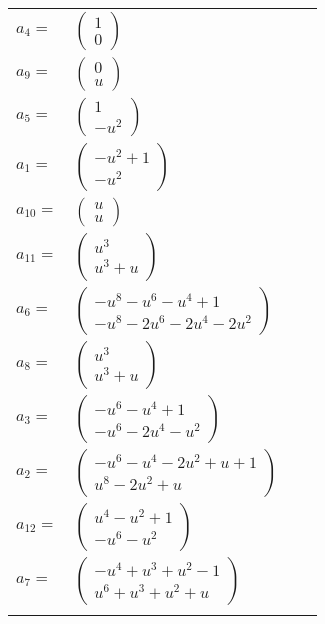 \documentclass[1p]{elsarticle_modified}
\theoremstyle{definition}
\begin{document}
\begin{tabular}{m{7pt} m{180pt} m{7pt} m{180pt} }
\flushright $a_{4}=$&$\begin{pmatrix}1\\0\end{pmatrix}$ \\
\flushright $a_{9}=$&$\begin{pmatrix}0\\u\end{pmatrix}$ \\
\flushright $a_{5}=$&$\begin{pmatrix}1\\- u^2\end{pmatrix}$ \\
\flushright $a_{1}=$&$\begin{pmatrix}- u^2+1\\- u^2\end{pmatrix}$ \\
\flushright $a_{10}=$&$\begin{pmatrix}u\\u\end{pmatrix}$ \\
\flushright $a_{11}=$&$\begin{pmatrix}u^3\\u^3+u\end{pmatrix}$ \\
\flushright $a_{6}=$&$\begin{pmatrix}- u^8- u^6- u^4+1\\- u^8-2 u^6-2 u^4-2 u^2\end{pmatrix}$ \\
\flushright $a_{8}=$&$\begin{pmatrix}u^3\\u^3+u\end{pmatrix}$ \\
\flushright $a_{3}=$&$\begin{pmatrix}- u^6- u^4+1\\- u^6-2 u^4- u^2\end{pmatrix}$ \\
\flushright $a_{2}=$&$\begin{pmatrix}- u^6- u^4-2 u^2+u+1\\u^8-2 u^2+u\end{pmatrix}$ \\
\flushright $a_{12}=$&$\begin{pmatrix}u^4- u^2+1\\- u^6- u^2\end{pmatrix}$ \\
\flushright $a_{7}=$&$\begin{pmatrix}- u^4+u^3+u^2-1\\u^6+u^3+u^2+u\end{pmatrix}$\\&\end{tabular}
\end{document}
